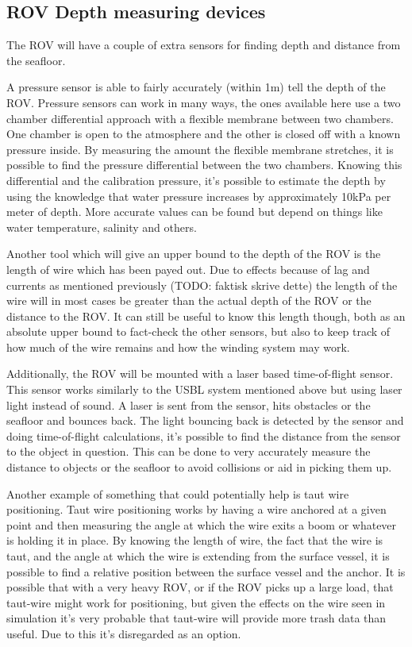 \documentclass[class=article, crop=false, draft=true]{standalone}
\begin{document}
\subsection{ROV Depth measuring devices}
The ROV will have a couple of extra sensors for finding depth and distance from the seafloor.

A pressure sensor is able to fairly accurately (within 1m) tell the depth of the ROV. Pressure sensors can work in many ways, the ones available here use a two chamber differential approach with a flexible membrane between two chambers. One chamber is open to the atmosphere and the other is closed off with a known pressure inside. By measuring the amount the flexible membrane stretches, it is possible to find the pressure differential between the two chambers. Knowing this differential and the calibration pressure, it's possible to estimate the depth by using the knowledge that water pressure increases by approximately 10kPa per meter of depth. More accurate values can be found but depend on things like water temperature, salinity and others.

Another tool which will give an upper bound to the depth of the ROV is the length of wire which has been payed out. Due to effects because of lag and currents as mentioned previously (TODO: faktisk skrive dette) the length of the wire will in most cases be greater than the actual depth of the ROV or the distance to the ROV. It can still be useful to know this length though, both as an absolute upper bound to fact-check the other sensors, but also to keep track of how much of the wire remains and how the winding system may work.

Additionally, the ROV will be mounted with a laser based time-of-flight sensor. This sensor works similarly to the USBL system mentioned above but using laser light instead of sound. A laser is sent from the sensor, hits obstacles or the seafloor and bounces back. The light bouncing back is detected by the sensor and doing time-of-flight calculations, it's possible to find the distance from the sensor to the object in question. This can be done to very accurately measure the distance to objects or the seafloor to avoid collisions or aid in picking them up.

Another example of something that could potentially help is taut wire positioning. Taut wire positioning works by having a wire anchored at a given point and then measuring the angle at which the wire exits a boom or whatever is holding it in place. By knowing the length of wire, the fact that the wire is taut, and the angle at which the wire is extending from the surface vessel, it is possible to find a relative position between the surface vessel and the anchor. It is possible that with a very heavy ROV, or if the ROV picks up a large load, that taut-wire might work for positioning, but given the effects on the wire seen in simulation it's very probable that taut-wire will provide more trash data than useful. Due to this it's disregarded as an option.
\end{document}

